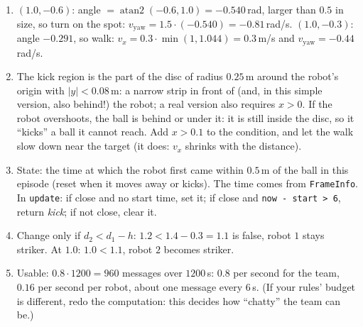 \begin{enumerate}[label=\textbf{\ansnum.\arabic*}]
  \item $(1.0,-0.6)$: angle $=\operatorname{atan2}(-0.6,1.0)=-0.540$\,rad, larger than $0.5$ in size, so turn on the spot: $v_{\text{yaw}}=1.5\cdot(-0.540)=-0.81$\,rad/s. $(1.0,-0.3)$: angle $-0.291$, so walk: $v_x=0.3\cdot\min(1,1.044)=0.3$\,m/s and $v_{\text{yaw}}=-0.44$\,rad/s.
  \item The kick region is the part of the disc of radius $0.25$\,m around the robot's origin with $|y|<0.08$\,m: a narrow strip in front of (and, in this simple version, also behind!) the robot; a real version also requires $x>0$. If the robot overshoots, the ball is behind or under it: it is still inside the disc, so it ``kicks'' a ball it cannot reach. Add $x>0.1$ to the condition, and let the walk slow down near the target (it does: $v_x$ shrinks with the distance).
  \item State: the time at which the robot first came within $0.5$\,m of the ball in this episode (reset when it moves away or kicks). The time comes from \texttt{FrameInfo}. In \texttt{update}: if close and no start time, set it; if close and \texttt{now - start > 6}, return \emph{kick}; if not close, clear it.
  \item Change only if $d_2<d_1-h$: $1.2<1.4-0.3=1.1$ is false, robot $1$ stays striker. At $1.0$: $1.0<1.1$, robot $2$ becomes striker.
  \item Usable: $0.8\cdot1200=960$ messages over $1200$\,s: $0.8$ per second for the team, $0.16$ per second per robot, about one message every $6$\,s. (If your rules' budget is different, redo the computation: this decides how ``chatty'' the team can be.)
\end{enumerate}
